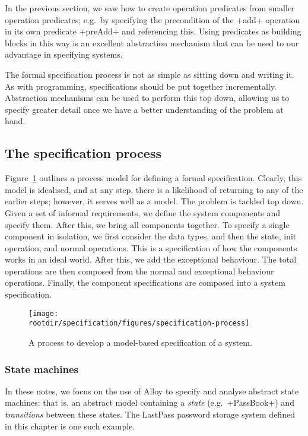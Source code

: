 In the previous section, we saw how to create operation predicates from smaller operation predicates; e.g.\ by specifying the precondition of the \A+add+ operation in its own predicate \A+preAdd+ and referencing this. Using predicates as building blocks in this way is an excellent abstraction mechanism that can be used to our advantage in specifying systems.

The formal specification process is not as simple as sitting down and writing it. As with programming, specifications should be put together incrementally. Abstraction mechanisms can be used to perform this top down, allowing us to specify greater detail once we have a better understanding of the problem at hand.

\subsection{The specification process}

Figure~\ref{fig:specification:specification-process} outlines a process model for defining a formal specification. Clearly, this model is idealised, and at any step, there is a likelihood of returning to any of the earlier steps; however, it serves well as a model. The problem is tackled top down. Given a set of informal requirements, we define the system components and specify them. After this, we bring all components together. To specify a single component in isolation, we first consider the data types, and then the state, init operation, and normal operations. This is a specification of how the components works in an ideal world. After this, we add the exceptional behaviour. The total operations are then composed from the normal and exceptional behaviour operations. Finally, the component specifications are composed into a system specification.

\begin{figure}[!h]
\texttt{[image: \\rootdir/specification/figures/specification-process]}
\caption{A process to develop a model-based specification of a system.}
\label{fig:specification:specification-process}
\end{figure}

\subsubsection{State machines}

In these notes, we focus on the use of Alloy to specify and analyse abstract state machines: that is, an abstract model containing a \emph{state} (e.g.\ \A+PassBook+) and \emph{transitions} between these states. The LastPass password storage system defined in this chapter is one such example.


